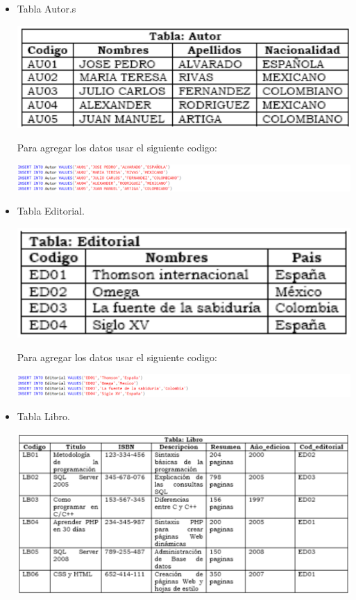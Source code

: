 \documentclass{article}
\begin{document}
\begin{enumerate}[\tab 1.]
\begin{itemize}
            \item Tabla Autor.s
            \begin{center}
                \includegraphics[width=13cm]{./images/2.png}
            \end{center}
            Para agregar los datos usar el siguiente codigo:
            \begin{center}
                \includegraphics[width=13cm]{./images/2.1.png}
            \end{center}
            \item Tabla Editorial.
            \begin{center}
                \includegraphics[width=13cm]{./images/3.png}
            \end{center}
            Para agregar los datos usar el siguiente codigo:
            \begin{center}
                \includegraphics[width=13cm]{./images/3.1.png}
            \end{center}
            \newpage
            \item Tabla Libro.
            \begin{center}
                \includegraphics[width=13cm]{./images/4.png}

\end{center}
\end{itemize}
\end{enumerate}
\end{document}

